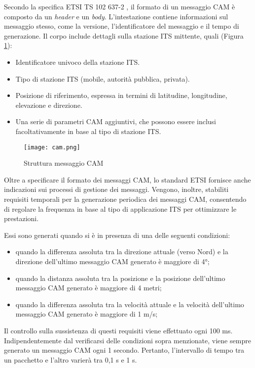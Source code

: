 Secondo la specifica ETSI TS 102 637-2 \cite{etsi2010102}, il formato di un messaggio CAM è composto da un \textit{header} e un \textit{body}. L'intestazione contiene informazioni sul messaggio stesso, come la versione, l'identificatore del messaggio e il tempo di generazione. Il corpo include dettagli sulla stazione ITS mittente, quali (Figura \ref{fig:cam}):

\begin{itemize}
    \item Identificatore univoco della stazione ITS.
    \item Tipo di stazione ITS (mobile, autorità pubblica, privata).
    \item Posizione di riferimento, espressa in termini di latitudine, longitudine, elevazione e direzione.
    \item Una serie di parametri CAM aggiuntivi, che possono essere inclusi facoltativamente in base al tipo di stazione ITS.
\end{itemize}

\begin{figure}[h!]
    \centering
    \texttt{[image: cam.png]}
    \caption{Struttura messaggio CAM}
    \label{fig:cam}
\end{figure}

Oltre a specificare il formato dei messaggi CAM, lo standard ETSI fornisce anche indicazioni sui processi di gestione dei messaggi. Vengono, inoltre, stabiliti requisiti temporali per la generazione periodica dei messaggi CAM, consentendo di regolare la frequenza in base al tipo di applicazione ITS per ottimizzare le prestazioni.

Essi sono generati quando si è in presenza di una delle seguenti condizioni:

\begin{itemize}
    \item quando la differenza assoluta tra la direzione attuale (verso Nord) e la direzione dell'ultimo messaggio CAM generato è maggiore di 4°;
    \item quando la distanza assoluta tra la posizione e la posizione dell'ultimo messaggio CAM generato è maggiore di 4 metri;
    \item quando la differenza assoluta tra la velocità attuale e la velocità dell'ultimo messaggio CAM generato è maggiore di 1 m/s;
\end{itemize}

Il controllo sulla sussistenza di questi requisiti viene effettuato ogni 100 ms. Indipendentemente dal verificarsi delle condizioni sopra menzionate, viene sempre generato un messaggio CAM ogni 1 secondo. Pertanto, l'intervallo di tempo tra un pacchetto e l'altro varierà tra 0,1 s e 1 s.

